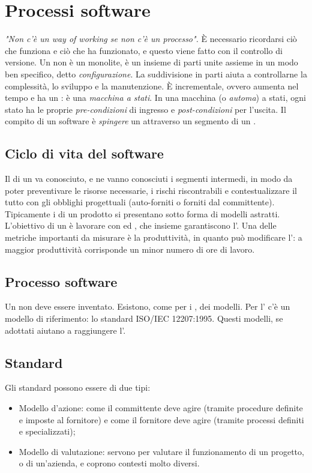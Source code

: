 \documentclass[../main.tex]{subfiles}
\begin{document}
\section{Processi software}
\textit{"Non c'è un way of working se non c'è un processo".}\newline
È necessario ricordarsi ciò che funziona e ciò che ha funzionato, e questo viene fatto con il controllo di versione.\newline
Un  non è un monolite, è un insieme di parti unite assieme in un modo ben specifico, detto \textit{configurazione}. La suddivisione in parti aiuta a controllarne la complessità, lo sviluppo e la manutenzione. È incrementale, ovvero aumenta nel tempo e ha un : è una \textit{macchina a stati}. In una macchina (o \textit{automa}) a stati, ogni stato ha le proprie \textit{pre-condizioni} di ingresso e \textit{post-condizioni} per l'uscita.\newline
Il compito di un  software è \textit{spingere} un  attraverso un segmento di un .
\subsection{Ciclo di vita del software}
Il  di un  va conosciuto, e ne vanno conosciuti i segmenti intermedi, in modo da poter preventivare le risorse necessarie, i rischi riscontrabili e contestualizzare il tutto con gli obblighi progettuali (auto-forniti o forniti dal committente).\newline
Tipicamente i  di un prodotto si presentano sotto forma di modelli astratti.
L'obiettivo di un  è lavorare con  ed , che insieme garantiscono l'. Una delle metriche importanti da misurare è la produttività, in quanto può modificare l': a maggior produttività corrisponde un minor numero di ore di lavoro.
\subsection{Processo software}
Un  non deve essere inventato. Esistono, come per i , dei modelli. Per l' c'è un modello di riferimento: lo standard ISO/IEC 12207:1995. Questi modelli, se adottati aiutano a raggiungere l'.
\subsection{Standard}
Gli standard possono essere di due tipi:
\begin{itemize}
    \item Modello d'azione: come il committente deve agire (tramite procedure definite e imposte al fornitore) e come il fornitore deve agire (tramite processi definiti e specializzati);
    \item Modello di valutazione: servono per valutare il funzionamento di un progetto, o di un'azienda, e coprono contesti molto diversi.
\end{itemize}
\end{document}
